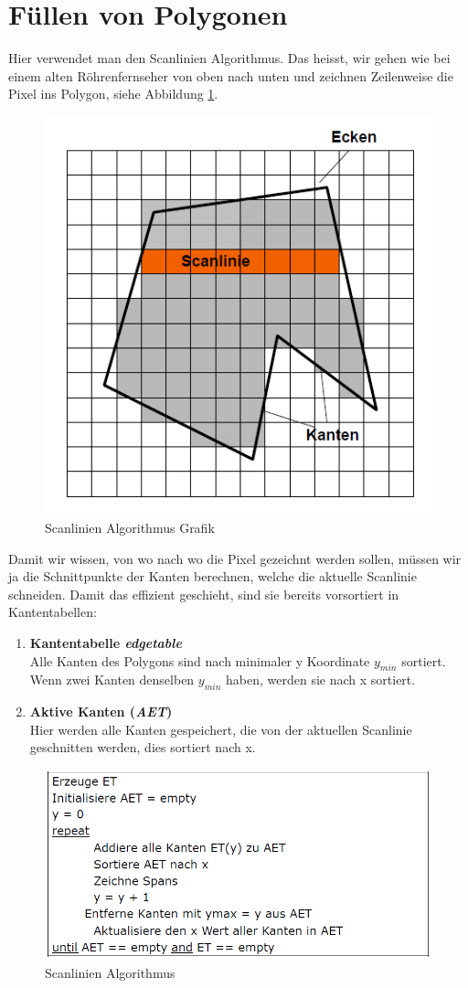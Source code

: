 \section{Füllen von Polygonen}
Hier verwendet man den Scanlinien Algorithmus. Das heisst, wir gehen wie bei einem alten Röhrenfernseher von oben nach unten und zeichnen Zeilenweise die Pixel ins Polygon, siehe Abbildung \ref{scanlinie}. 
\begin{figure}[!ht]
	\centering
	\includegraphics[width=0.4\linewidth]{fig/scanlinie}
	\caption{Scanlinien Algorithmus Grafik}
	\label{scanlinie}
\end{figure}
Damit wir wissen, von wo nach wo die Pixel gezeichnt werden sollen, müssen wir ja die Schnittpunkte der Kanten berechnen, welche die aktuelle Scanlinie schneiden. Damit das effizient geschieht, sind sie bereits vorsortiert in Kantentabellen:
\begin{enumerate}
	\item \textbf{Kantentabelle \textit{edgetable}}\\
	Alle Kanten des Polygons sind nach minimaler y Koordinate \(y_{min}\) sortiert. Wenn zwei Kanten denselben \(y_{min}\) haben, werden sie nach x sortiert.
	\item \textbf{Aktive Kanten (\textit{AET})}\\
	Hier werden alle Kanten gespeichert, die von der aktuellen Scanlinie geschnitten werden, dies sortiert nach x.
\end{enumerate}
\begin{figure}[!ht]
	\centering
	\includegraphics[width=0.5\linewidth]{fig/scanlinie_algo}
	\caption{Scanlinien Algorithmus}
	\label{scanlinie_algo}
\end{figure}
